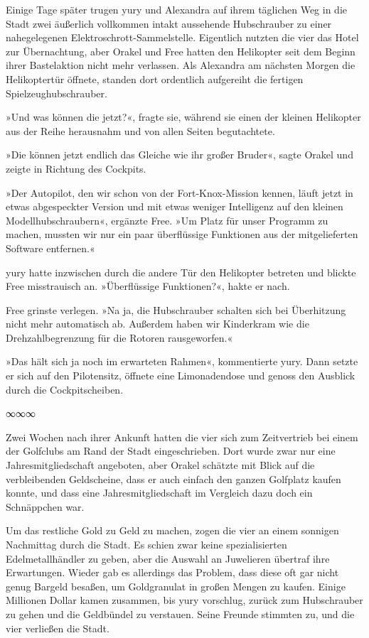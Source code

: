 Einige Tage später trugen yury und Alexandra auf ihrem täglichen Weg in die Stadt zwei äußerlich vollkommen intakt aussehende Hubschrauber zu einer nahegelegenen Elektroschrott-Sammelstelle. Eigentlich nutzten die vier das Hotel zur Übernachtung, aber Orakel und Free hatten den Helikopter seit dem Beginn ihrer Bastelaktion nicht mehr verlassen. Als Alexandra am nächsten Morgen die Helikoptertür öffnete, standen dort ordentlich aufgereiht die fertigen Spielzeughubschrauber.

»Und was können die jetzt?«, fragte sie, während sie einen der kleinen Helikopter aus der Reihe herausnahm und von allen Seiten begutachtete.

»Die können jetzt endlich das Gleiche wie ihr großer Bruder«, sagte Orakel und zeigte in Richtung des Cockpits.

»Der Autopilot, den wir schon von der Fort-Knox-Mission kennen, läuft jetzt in etwas abgespeckter Version und mit etwas weniger Intelligenz auf den kleinen Modellhubschraubern«, ergänzte Free. »Um Platz für unser Programm zu machen, mussten wir nur ein paar überflüssige Funktionen aus der mitgelieferten Software entfernen.«

yury hatte inzwischen durch die andere Tür den Helikopter betreten und blickte Free misstrauisch an. »Überflüssige Funktionen?«, hakte er nach.

Free grinste verlegen. »Na ja, die Hubschrauber schalten sich bei Überhitzung nicht mehr automatisch ab. Außerdem haben wir Kinderkram wie die Drehzahlbegrenzung für die Rotoren rausgeworfen.«

»Das hält sich ja noch im erwarteten Rahmen«, kommentierte yury. Dann setzte er sich auf den Pilotensitz, öffnete eine Limonadendose und genoss den Ausblick durch die Cockpitscheiben.

\begin{center}
    ∞∞∞
\end{center}

Zwei Wochen nach ihrer Ankunft hatten die vier sich zum Zeitvertrieb bei einem der Golfclubs am Rand der Stadt eingeschrieben. Dort wurde zwar nur eine Jahresmitgliedschaft angeboten, aber Orakel schätzte mit Blick auf die verbleibenden Geldscheine, dass er auch einfach den ganzen Golfplatz kaufen konnte, und dass eine Jahresmitgliedschaft im Vergleich dazu doch ein Schnäppchen war.

Um das restliche Gold zu Geld zu machen, zogen die vier an einem sonnigen Nachmittag durch die Stadt. Es schien zwar keine spezialisierten Edelmetallhändler zu geben, aber die Auswahl an Juwelieren übertraf ihre Erwartungen. Wieder gab es allerdings das Problem, dass diese oft gar nicht genug Bargeld besaßen, um Goldgranulat in großen Mengen zu kaufen. Einige Millionen Dollar kamen zusammen, bis yury vorschlug, zurück zum Hubschrauber zu gehen und die Geldbündel zu verstauen. Seine Freunde stimmten zu, und die vier verließen die Stadt.

